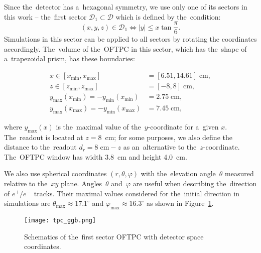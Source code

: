 				Since the~detector has a~hexagonal symmetry, we use only one of its sectors in this work -- the~first sector $\mathcal{D}_1 \subset \mathcal{D}$ which is defined by the~condition:
					\begin{equation}
						(x,y,z) \in \mathcal{D}_1 \Leftrightarrow |y| \leq x\tan \frac{\pi}{6}.
					\end{equation}
				Simulations in this sector can be applied to all sectors by rotating the coordinates accordingly. The~volume of the~\ac{OFTPC} in this sector, which has the~shape of a~trapezoidal prism, has these boundaries:
					\begin{linenomath}
						\begin{align}
							x \in [x_\text{min},x_\text{max}] &= [6.51, 14.61] \;\text{cm},\\
							z \in [z_\text{min},z_\text{max}] &= [-8,8] \;\text{cm},\\
							y_\text{max}(x_\text{min}) = -y_\text{min}(x_\text{min}) &=  2.75\;\text{cm},\\
							y_\text{max}(x_\text{max}) = -y_\text{min}(x_\text{max}) &=  7.45\;\text{cm},
						\end{align}
					\end{linenomath}
				where $y_\text{max}(x)$ is the~maximal value of the~$y$-coordinate for a~given $x$. The~readout is located at $z = 8$~cm; for some purposes, we also define the distance to the~readout $d_r = 8\;\text{cm}-z$ as an~alternative to the~$z$-coordinate.  The~\ac{OFTPC} window has width 3.8~cm and height 4.0~cm.
				
				We also use spherical coordinates $(r,\theta,\varphi)$ with the~elevation angle~$\theta$ measured relative to the~$xy$ plane. Angles~$\theta$ and~$\varphi$ are useful when describing the~direction of $e^+/e^-$~tracks. Their maximal values considered for the~initial direction in simulations are $\theta_\text{max} \approx 17.1^\circ$ and $\varphi_\text{max} \approx 16.3^\circ$ as shown in Figure~\ref{fig:oftpc}.
				
				\begin{figure}
					\centering
					\texttt{[image: tpc\_ggb.png]}
					\caption{Schematics of the~first sector \ac{OFTPC} with detector space coordinates.}
					\label{fig:oftpc}
				\end{figure}
			
